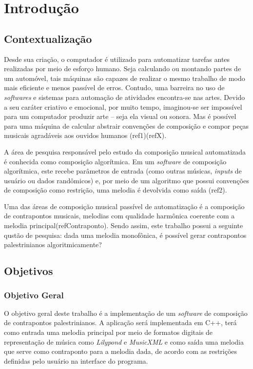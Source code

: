 \chapter*[Introdução]{Introdução}

  \section*{Contextualização}

  Desde sua criação, o computador é utilizado para automatizar tarefas antes realizadas por meio de esforço humano. Seja calculando ou montando partes de um automóvel, tais máquinas são capazes de realizar o mesmo trabalho de modo mais eficiente e menos passível de erros. Contudo, uma barreira no uso de \textit{softwares} e sistemas para automação de atividades encontra-se nas artes. Devido a seu caráter criativo e emocional, por muito tempo, imaginou-se ser impossível para um computador produzir arte -- seja ela visual ou sonora. Mas é possível para uma máquina de calcular abstrair convenções de composição e compor peças musicais agradáveis aos ouvidos humanos (ref1)(refX).

  A área de pesquisa responsável pelo estudo da composição musical automatizada é conhecida como composição algorítmica. Em um \textit{software} de composição algorítmica, este recebe parâmetros de entrada (como outras músicas, \textit{inputs} de usuário ou dados randômicos) e, por meio de um algoritmo que possui convenções de composição como restrição, uma melodia é devolvida como saída (ref2).

  Uma das áreas de composição musical passível de automatização é a composição de contrapontos musicais, melodias com qualidade harmônica coerente com a melodia principal(refContraponto). Sendo assim, este trabalho possui a seguinte qustão de pesquisa: dada uma melodia monofônica, é possível gerar contrapontos palestrinianos algoritmicamente?

  \section*{Objetivos}

    \subsection*{Objetivo Geral}

      O objetivo geral deste trabalho é a implementação de um \textit{software} de composição de contrapontos palestrinianos. A aplicação será implementada em C++, terá como entrada uma melodia principal por meio de formatos digitais de representação de música como \textit{Lilypond} e \textit{MusicXML} e como saída uma melodia que serve como contraponto para a melodia dada, de acordo com as restrições definidas pelo usuário na interface do programa.

